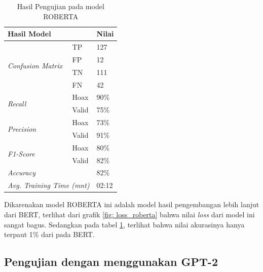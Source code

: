 \begin{table}[h]
    \caption{Hasil Pengujian pada model ROBERTA}
    \label{tab: loss_roberta}
    \centering
    \begin{tabular}{|l|l|l|}
        \hline
        \multicolumn{2}{|l|}{\textbf{Hasil Model}}              & \textbf{Nilai}        \\ \hline
        \multirow{4}{*}{\textit{Confusion Matrix}}              & TP             & 127  \\ \cline{2-3}
                                                                & FP             & 12   \\ \cline{2-3}
                                                                & TN             & 111  \\ \cline{2-3}
                                                                & FN             & 42   \\ \hline
        \multirow{2}{*}{\textit{Recall}}                        & Hoax           & 90\% \\ \cline{2-3}
                                                                & Valid          & 75\% \\ \hline
        \multirow{2}{*}{\textit{Precision}}                     & Hoax           & 73\% \\ \cline{2-3}
                                                                & Valid          & 91\% \\ \hline
        \multirow{2}{*}{\textit{F1-Score}}                      & Hoax           & 80\% \\ \cline{2-3}
                                                                & Valid          & 82\% \\ \hline
        \multicolumn{2}{|l|}{\textit{Accuracy}}                 & 82\%                  \\ \hline
        \multicolumn{2}{|l|}{\textit{Avg. Training Time (mnt)}} & 02:12                 \\ \hline
    \end{tabular}
\end{table}

Dikarenakan model ROBERTA ini adalah model hasil pengembangan lebih lanjut dari BERT, terlihat dari grafik \ref{fig: loss_roberta} bahwa nilai \textit{loss} dari model ini sangat bagus. Sedangkan pada tabel \ref{tab: loss_roberta}, terlihat bahwa nilai akurasinya hanya terpaut 1\% dari pada BERT.

\subsection{Pengujian dengan menggunakan GPT-2}

